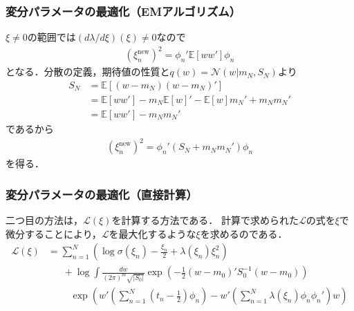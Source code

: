 \documentclass[10pt,hyperref={unicode}]{beamer}
\newcommand{\absolute}[1]{\left|#1\right|}
\newcommand{\parentheses}[1]{\left(#1\right)}
\newcommand{\brackets}[1]{\left[#1\right]}
\newcommand{\energy}{\mathcal{L}}
\begin{document}
\begin{frame}
\frametitle{変分パラメータの最適化（EMアルゴリズム）}
$\xi \neq 0$の範囲では$\parentheses{d\lambda/d\xi}\parentheses{\xi} \neq 0$なので
\begin{align*}
    \parentheses{\xi_n^{\mathrm{new}}}^2 = \phi_n'\mathbb{E}\brackets{ww'}\phi_n
\end{align*}
となる．分散の定義，期待値の性質と$q\parentheses{w} = \mathcal{N}\parentheses{w|m_N,S_N}$より
\begin{align*}
    S_N &= \mathbb{E}\brackets{\parentheses{w - m_N}\parentheses{w - m_N}'} \\
        &= \mathbb{E}\brackets{ww'} - m_N\mathbb{E}\brackets{w}' - \mathbb{E}\brackets{w}m_N' + m_N m_N' \\
        &= \mathbb{E}\brackets{ww'} - m_N m_N'
\end{align*}
であるから
\begin{align}
    \parentheses{\xi_n^{\mathrm{new}}}^2 = \phi_n'\parentheses{S_N + m_N m_N'}\phi_n \tag{10.163}
\end{align}
を得る．
\end{frame}

\begin{frame}
\frametitle{変分パラメータの最適化（直接計算）}
二つ目の方法は，$\energy\parentheses{\xi}$を計算する方法である．
計算で求められた$\energy$の式を$\xi$で微分することにより，$\energy$を最大化するような$\xi$を求めるのである．
\begin{align*}
    \energy\parentheses{\xi}
    &= \sum_{n = 1}^N
        \parentheses{%
            \log\sigma\parentheses{\xi_n}
            - \frac{\xi_n}{2}
            + \lambda\parentheses{\xi_n}\xi_n^2
        } \\
    &\phantom{=}\ +\log \int
        \frac{dw}{\parentheses{%
            2\pi}^m\sqrt{\absolute{S_0}}
        }
        \exp\parentheses{%
            -\frac{1}{2}\parentheses{w - m_0}' S_0^{-1} \parentheses{w - m_0}
        }\\
    &\phantom{=+}\ \exp\parentheses{%
            w'\parentheses{%
                \sum_{n = 1}^N \parentheses{t_n - \frac{1}{2}}\phi_n
            }
            -w'\parentheses{%
                \sum_{n = 1}^N \lambda\parentheses{\xi_n}\phi_n\phi_n'
            }w
        }
\end{align*}
\end{frame}
\end{document}
